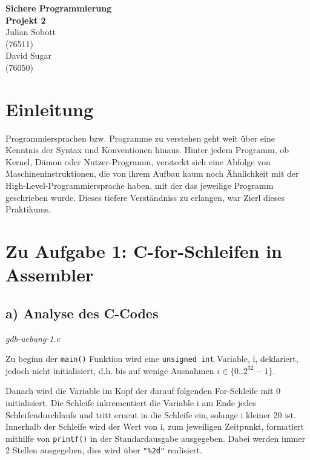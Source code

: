 \documentclass[12pt]{article}
\begin{document}
\begin{center}
  \textbf{\LARGE Sichere Programmierung} \\[1ex]%
  \textbf{\Large Projekt 2}\\[2ex] %
  Julian Sobott \\ %
  (76511) \\ %
  David Sugar \\ %
  (76050) \\ %
  
\end{center}

\newpage
\tableofcontents
\newpage

\section{Einleitung}
Programmiersprachen bzw. Programme zu verstehen geht weit über eine Kenntnis der Syntax und Konventionen hinaus. Hinter jedem Programm, ob Kernel, Dämon oder Nutzer-Programm, versteckt sich eine Abfolge von Maschineninstruktionen, die von ihrem Aufbau kaum noch Ähnlichkeit mit der High-Level-Programmiersprache haben, mit der das jeweilige Programm geschrieben wurde. Dieses tiefere Verständniss zu erlangen, war Zierl dieses Praktikums.



\section{Zu Aufgabe 1: C-for-Schleifen in Assembler}
\subsection{a) Analyse des C-Codes}

\textit{gdb-uebung-1.c}



Zu beginn der \texttt{main()} Funktion wird eine \texttt{unsigned int} Variable, i, deklariert, jedoch nicht initialisiert, d.h. bis auf wenige Ausnahmen $i \in \{0..2^{32}-1\}$.

Danach wird die Variable im Kopf der darauf folgenden For-Schleife mit 0 initialisiert. Die Schleife inkrementiert die Variable i am Ende jedes Schleifendurchlaufs und tritt erneut in die Schleife ein, solange i kleiner 20 ist.
Innerhalb der Schleife wird der Wert von i, zum jeweiligen Zeitpunkt, formatiert mithilfe von \texttt{printf()} in der Standardausgabe ausgegeben. Dabei werden immer 2 Stellen ausgegeben, dies wird über \texttt{"\%2d"} realisiert.
\end{document}
